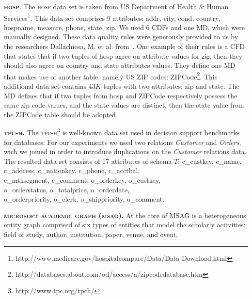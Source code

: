 \textbf{\textsc{hosp}}. The \textsc{hosp} data set is taken from US Department of Health $\&$ Human Services\footnote{http://www.medicare.gov/hospitalcompare/Data/Data-Download.html}. This data set comprises 9 attributes: \textsf{addr}, \textsf{city}, \textsf{cond}, \textsf{country}, \textsf{hospname}, \textsf{measure}, \textsf{phone}, \textsf{state}, \textsf{zip}. 
We used 6 CDFs and one MD, which were manually designed. These data quality rules were generously provided to us by the researchers Dallachiesa, M. et al. from~\cite{Dallachiesa:2013:NCD:2463676.2465327}. One example of their rules is a CFD that states that if two tuples of \textsf{hosp} agree on attribute values for $\textsf{zip}$, then they should also agree on \textsf{country} and \textsf{state} attributes values. They define one MD that makes use of another table, namely US ZIP codes: ZIPCode\footnote{http://databases.about.com/od/access/a/zipcodedatabase.htm}. This additional data set contains $43K$ tuples with two attributes: \textsf{zip} and \textsf{state}. The MD defines that if two tuples from \textsf{hosp} and ZIPCode respectively possess the same zip code values, and the state values are distinct, then the state value from the ZIPCode table should be adopted. 

\textbf{\textsc{tpc-h}.} The \textsc{tpc-h}\footnote{http://www.tpc.org/tpch/} is well-known data set used in decision support benchmarks for databases. For our experiments we used two relations \textit{Customer} and \textit{Orders}, wich we joined in order to introduce duplications on the \textit{Customer} relations data. The resulted data set consists of 17 attributes of schema $T$: \textsf{c\_custkey}, \textsf{c\_name}, \textsf{c\_address},  \textsf{c\_nationkey}, \textsf{c\_phone}, \textsf{c\_acctbal},\\ \textsf{c\_mtksegment}, \textsf{c\_comment}, \textsf{o\_orderkey}, \textsf{o\_custkey},\\ \textsf{o\_orderstatus}, \textsf{o\_totalprice}, \textsf{o\_orderdate},\\ \textsf{o\_orderpriority}, \textsf{o\_clerk}, \textsf{o\_shippriority}, \textsf{o\_comment}.  

\textbf{\textsc{microsoft academic graph (msag)}.} \cite{msag2015} At the core of MSAG is a heterogeneous entity graph comprised of six types of entities that model the scholarly activities: field of study, author, institution, paper, venue, and event.


